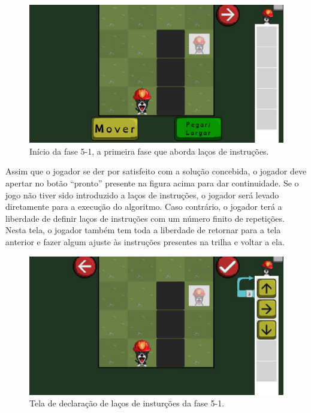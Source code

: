\documentclass[conference]{IEEEtran}
\begin{document}
\begin{figure}[htbp]
\centerline{\includegraphics[scale=0.275]{images/fig01.jpg}}
\caption{Início da fase 5-1, a primeira fase que aborda laços de instruções.}
\label{fig}
\end{figure}

Assim que o jogador se der por satisfeito com a solução concebida, o jogador deve apertar no botão “pronto” presente na figura acima para dar continuidade. Se o jogo não tiver sido introduzido a laços de instruções, o jogador será levado diretamente para a execução do algoritmo. Caso contrário, o jogador terá a liberdade de definir laços de instruções com um número finito de repetições. Nesta tela, o jogador também tem toda a liberdade de retornar para a tela anterior e fazer algum ajuste às instruções presentes na trilha e voltar a ela.

\begin{figure}[htbp]
\centerline{\includegraphics[scale=0.275]{images/fig02.jpg}}
\caption{Tela de declaração de laços de insturções da fase 5-1.}
\label{fig}
\end{figure}
\end{document}
